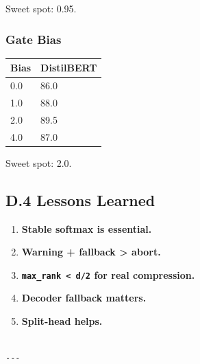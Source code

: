 Sweet spot: 0.95.

\subsubsection{Gate Bias}

\begin{table}[H]
\centering
\small
\begin{tabular}{ll}
\toprule
\textbf{Bias} & \textbf{DistilBERT} \\
\midrule
0.0 & 86.0 \\
1.0 & 88.0 \\
2.0 & 89.5 \\
4.0 & 87.0 \\
\bottomrule
\end{tabular}
\end{table}

Sweet spot: 2.0.

\subsection{D.4 Lessons Learned}

\begin{enumerate}
\item \textbf{Stable softmax is essential.}
\item \textbf{Warning + fallback \textgreater{} abort.}
\item \textbf{\texttt{max\_rank \textless{} d/2} for real compression.}
\item \textbf{Decoder fallback matters.}
\item \textbf{Split-head helps.}
\end{enumerate}
\begin{lstlisting}

---
\end{lstlisting}